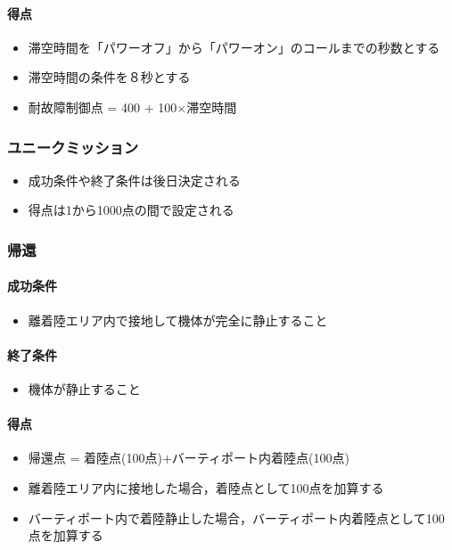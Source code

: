 \paragraph{得点}
\begin{itemize}
  \item 滞空時間を「パワーオフ」から「パワーオン」のコールまでの秒数とする
  \item 滞空時間の条件を８秒とする
  \item 耐故障制御点 = 400 + 100$\times$滞空時間
\end{itemize}

\subsubsection{ユニークミッション}
\begin{itemize}
  \item 成功条件や終了条件は後日決定される
  \item 得点は1から1000点の間で設定される
\end{itemize}

\subsubsection{帰還}
\paragraph{成功条件}
\begin{itemize}
\item 離着陸エリア内で接地して機体が完全に静止すること
\end{itemize}
\paragraph{終了条件}
\begin{itemize}
\item 機体が静止すること
\end{itemize}
\paragraph{得点}
\begin{itemize}
\item 帰還点 = 着陸点(100点)+バーティポート内着陸点(100点)
\item 離着陸エリア内に接地した場合，着陸点として100点を加算する
\item バーティポート内で着陸静止した場合，バーティポート内着陸点として100点を加算する
\end{itemize}
